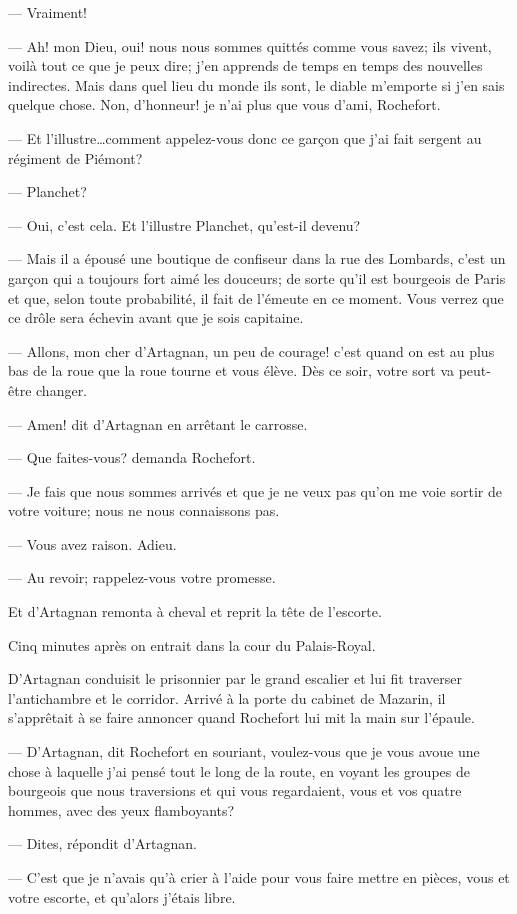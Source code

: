 — Vraiment!

— Ah! mon Dieu, oui! nous nous sommes quittés comme vous savez; ils vivent, voilà tout ce que je peux dire; j'en apprends de temps en temps des nouvelles indirectes. Mais dans quel lieu du monde ils sont, le diable m'emporte si j'en sais quelque chose. Non, d'honneur! je n'ai plus que vous d'ami, Rochefort.

— Et l'illustre\dots comment appelez-vous donc ce garçon que j'ai fait sergent au régiment de Piémont?

— Planchet?

— Oui, c'est cela. Et l'illustre Planchet, qu'est-il devenu?

— Mais il a épousé une boutique de confiseur dans la rue des Lombards, c'est un garçon qui a toujours fort aimé les douceurs; de sorte qu'il est bourgeois de Paris et que, selon toute probabilité, il fait de l'émeute en ce moment. Vous verrez que ce drôle sera échevin avant que je sois capitaine.

— Allons, mon cher d'Artagnan, un peu de courage! c'est quand on est au plus bas de la roue que la roue tourne et vous élève. Dès ce soir, votre sort va peut-être changer.

— Amen! dit d'Artagnan en arrêtant le carrosse.

— Que faites-vous? demanda Rochefort.

— Je fais que nous sommes arrivés et que je ne veux pas qu'on me voie sortir de votre voiture; nous ne nous connaissons pas.

— Vous avez raison. Adieu.

— Au revoir; rappelez-vous votre promesse.

Et d'Artagnan remonta à cheval et reprit la tête de l'escorte.

Cinq minutes après on entrait dans la cour du Palais-Royal.

D'Artagnan conduisit le prisonnier par le grand escalier et lui fit traverser l'antichambre et le corridor. Arrivé à la porte du cabinet de Mazarin, il s'apprêtait à se faire annoncer quand Rochefort lui mit la main sur l'épaule.

— D'Artagnan, dit Rochefort en souriant, voulez-vous que je vous avoue une chose à laquelle j'ai pensé tout le long de la route, en voyant les groupes de bourgeois que nous traversions et qui vous regardaient, vous et vos quatre hommes, avec des yeux flamboyants?

— Dites, répondit d'Artagnan.

— C'est que je n'avais qu'à crier à l'aide pour vous faire mettre en pièces, vous et votre escorte, et qu'alors j'étais libre.


